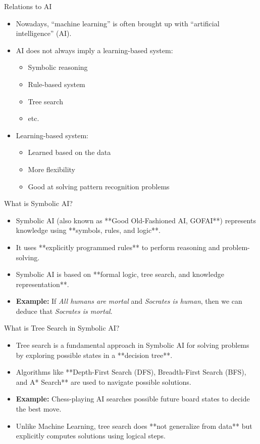 \documentclass{beamer}
\begin{document}
\begin{frame}{Relations to AI}
    \begin{itemize}
        \item Nowadays, “machine learning” is often brought up with “artificial intelligence” (AI).
        \item AI does not always imply a learning-based system:
        \begin{itemize}
            \item Symbolic reasoning
            \item Rule-based system
            \item Tree search
            \item etc.
        \end{itemize}
        \item Learning-based system:
        \begin{itemize}
            \item Learned based on the data
            \item More flexibility
            \item Good at solving pattern recognition problems
        \end{itemize}
    \end{itemize}
\end{frame}

\begin{frame}{What is Symbolic AI?}
    \begin{itemize}
        \item Symbolic AI (also known as **Good Old-Fashioned AI, GOFAI**) represents knowledge using **symbols, rules, and logic**.
        \item It uses **explicitly programmed rules** to perform reasoning and problem-solving.
        \item Symbolic AI is based on **formal logic, tree search, and knowledge representation**.
        \item \textbf{Example:} If \textit{All humans are mortal} and \textit{Socrates is human}, then we can deduce that \textit{Socrates is mortal}.
    \end{itemize}
\end{frame}

\begin{frame}{What is Tree Search in Symbolic AI?}
    \begin{itemize}
        \item Tree search is a fundamental approach in Symbolic AI for solving problems by exploring possible states in a **decision tree**.
        \item Algorithms like **Depth-First Search (DFS), Breadth-First Search (BFS), and A* Search** are used to navigate possible solutions.
        \item \textbf{Example:} Chess-playing AI searches possible future board states to decide the best move.
        \item Unlike Machine Learning, tree search does **not generalize from data** but explicitly computes solutions using logical steps.
    \end{itemize}
\end{frame}
\end{document}
